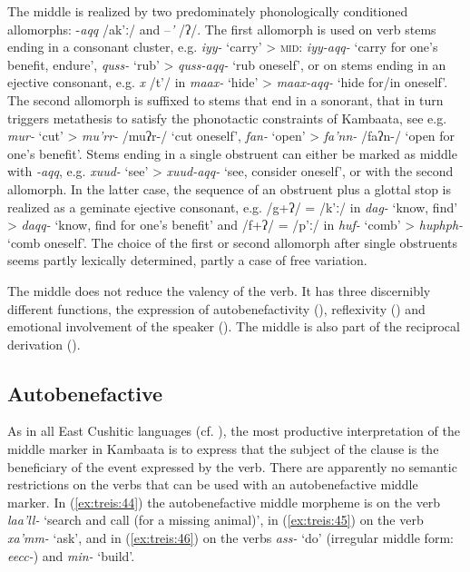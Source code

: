 \documentclass[output=paper]{langscibook}
\begin{document}
The middle is realized by two predominately phonologically conditioned allomorphs: -\textit{aqq} /ak’ː/ and –\textit{’} /ʔ/. The first allomorph is used on verb stems ending in a consonant cluster, e.g. \textit{iyy-} ‘carry’ > \textsc{mid:} \textit{iyy-aqq-} ‘carry for one’s benefit, endure’, \textit{quss-} ‘rub’ > \textit{quss-aqq-} ‘rub oneself’, or on stems ending in an ejective consonant, e.g. \textit{x} /t’/ in \textit{maax-} ‘hide’ > \textit{maax-aqq-} ‘hide for/in oneself’. The second allomorph is suffixed to stems that end in a sonorant, that in turn triggers metathesis to satisfy the phonotactic constraints of Kambaata, see e.g. \textit{mur-} ‘cut’ > \textit{mu’rr-} /muʔr-/ ‘cut oneself’, \textit{fan-} ‘open’ > \textit{fa’nn-} /faʔn-/ ‘open for one’s benefit’. Stems ending in a single obstruent can either be marked as middle with \textit{-aqq}, e.g. \textit{xuud-} ‘see’ > \textit{xuud-aqq-} ‘see, consider oneself’, or with the second allomorph. In the latter case, the sequence of an obstruent plus a glottal stop is realized as a geminate ejective consonant, e.g. /g+ʔ/ = /k’ː/ in \textit{dag-} ‘know, find’ > \textit{daqq-} ‘know, find for one’s benefit’ and /f+ʔ/ = /p’ː/ in \textit{huf-} ‘comb’ > \textit{huphph-} ‘comb oneself’. The choice of the first or second allomorph after single obstruents seems partly lexically determined, partly a case of free variation.

The middle does not reduce the valency of the verb. It has three discernibly different functions, the expression of autobenefactivity (), reflexivity () and emotional involvement of the speaker (). The middle is also part of the reciprocal derivation ().

\subsection{Autobenefactive}\label{sec:treis:4.1}

As in all East Cushitic languages (cf. \citealt{Mous2004}), the most productive interpretation of the middle marker in Kambaata is to express that the subject of the clause is the beneficiary of the event expressed by the verb. There are apparently no semantic restrictions on the verbs that can be used with an autobenefactive middle marker. In (\ref{ex:treis:44}) the autobenefactive middle morpheme is on the verb \textit{laa’ll-} \textsc{‘}search and call (for a missing animal)’, in (\ref{ex:treis:45}) on the verb \textit{xa’mm-} ‘ask’, and in (\ref{ex:treis:46}) on the verbs \textit{ass-} ‘do’ (irregular middle form: \textit{eecc-}) and \textit{min-} ‘build’.
\end{document}
